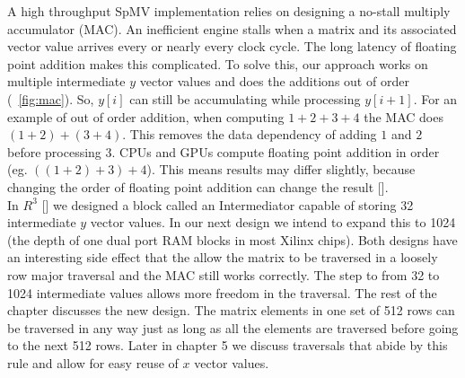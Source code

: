 A high throughput SpMV implementation relies on designing a no-stall multiply accumulator (MAC). An inefficient engine stalls when a matrix and its associated vector value arrives every or nearly every clock cycle. The long latency of floating point addition makes this complicated. To solve this, our approach works on multiple intermediate $y$ vector values and does the additions out of order (\figurename~\ref{fig:mac}). So, $y[i]$ can still be accumulating while processing $y[i+1]$. For an example of out of order addition, when computing $1+2+3+4$ the MAC does $(1+2)+(3+4)$. This removes the data dependency of adding $1$ and $2$ before processing $3$. CPUs and GPUs compute floating point addition in order (eg. $\left((1+2)+3\right)+4$). This means results may differ slightly, because changing the order of floating point addition can change the result [\cite{prelim:goldberg}].\\
\indent In $R^3$ [\cite{prelim:townsend}] we designed a block called an Intermediator capable of storing 32 intermediate $y$ vector values. In our next design we intend to expand this to 1024 (the depth of one dual port RAM blocks in most Xilinx chips). Both designs have an interesting side effect that the allow the matrix to be traversed in a loosely row major traversal and the MAC still works correctly. The step to from 32 to 1024 intermediate values allows more freedom in the traversal. The rest of the chapter discusses the new design. The matrix elements in one set of 512 rows can be traversed in any way just as long as all the elements are traversed before going to the next 512 rows. Later in chapter 5 we discuss traversals that abide by this rule and allow for easy reuse of $x$ vector values.
